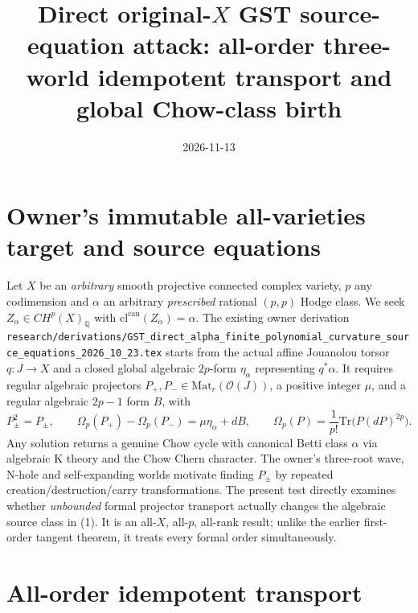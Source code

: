 \documentclass[11pt]{article}
\title{Direct original-\(X\) GST source-equation attack: all-order three-world idempotent transport and global Chow-class birth}
\date{2026-11-13}
\begin{document}
\maketitle

\section{Owner's immutable all-varieties target and source equations}
Let \(X\) be an \emph{arbitrary} smooth projective connected complex variety, \(p\) any codimension and \(\alpha\) an arbitrary \emph{prescribed} rational \((p,p)\) Hodge class. We seek \(Z_\alpha\in CH^p(X)_{\mathbb Q}\) with \(\mathrm{cl}^{\mathrm{can}}(Z_\alpha)=\alpha\).
The existing owner derivation \texttt{research/derivations/GST\_direct\_alpha\_finite\_polynomial\_curvature\_source\_equations\_2026\_10\_23.tex} starts from the actual affine Jouanolou torsor \(q:J\to X\) and a closed global algebraic \(2p\)-form \(\eta_\alpha\) representing \(q^*\alpha\). It requires regular algebraic projectors \(P_+,P_-\in\mathrm{Mat}_r(\mathcal O(J))\), a positive integer \(\mu\), and a regular algebraic \(2p-1\) form \(B\), with
\[
P_\pm^2=P_\pm,\qquad
\Omega_p(P_+)-\Omega_p(P_-)=\mu\eta_\alpha+dB,\qquad
\Omega_p(P)=\frac1{p!}\mathrm{Tr}\big(P(dP)^{2p}\big).
\tag{1}
\]
Any solution returns a genuine Chow cycle with canonical Betti class \(\alpha\) via algebraic K theory and the Chow Chern character. The owner's three-root wave, N-hole and self-expanding worlds motivate finding \(P_\pm\) by repeated creation/destruction/carry transformations. The present test directly examines whether \emph{unbounded} formal projector transport actually changes the algebraic source class in (1). It is an all-\(X\), all-\(p\), all-rank result; unlike the earlier first-order tangent theorem, it treats every formal order simultaneously.

\section{All-order idempotent transport}
\end{document}
